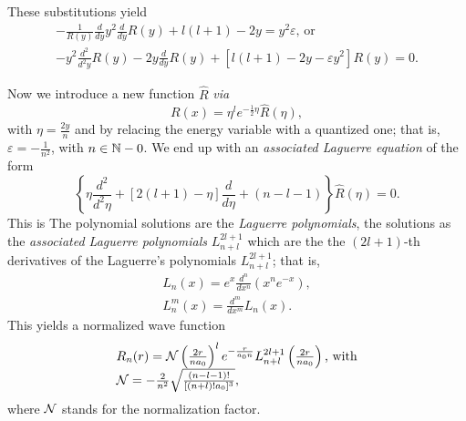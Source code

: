 These substitutions yield
\begin{equation}
\begin{array}{l}
-\frac{1}{R(y)} \frac{d}{   d    y}  y^2\frac{   d   }{   d    y} R( y ) +    l(l+1)
-2 y
 = y^2 \varepsilon \textrm{, or}\\
-y^2 \frac{d^2}{   d^2    y} R( y )  - 2 y \frac{   d   }{   d    y} R( y )
+ \left[   l(l+1) -2 y   -\varepsilon   y^2  \right] R( y )
 = 0.
\end{array}
\label{2011-m-ch-qae4a191}
\end{equation}

Now we introduce a new function $\hat{R}$  {\it via}
\begin{equation}
R(x)=\eta^l e^{-\frac{1}{2}\eta}\hat{R}(\eta) ,
\label{2011-m-ch-qae4a19s}
\end{equation}
with $\eta=\frac{2y}{n}$ and by relacing the energy variable with a quantized one;
that is,  $\varepsilon =-\frac{1}{n^2}$, with $n\in {\Bbb N}-0$.
We end up with an {\em associated Laguerre equation}
 of the form
\begin{equation}
\left\{
\eta   \frac{d^2}{   d^2    \eta }
+[2(l+1)-\eta ]  \frac{d }{   d     \eta }
+(n-l-1)
\right\}    \hat{R}( \eta ) =0.
\label{2011-m-ch-qaeale}
\end{equation}
This is
The polynomial solutions are the
{\em Laguerre polynomials},
 the solutions as the {\it associated Laguerre polynomials}
$L^{2l+1}_{n+l}$
which are the  the $(2l+1)$-th derivatives of the
Laguerre's polynomials  $L^{2l+1}_{n+l}$;
that is,
\begin{equation}
\begin{array}{l}
 L_n(x)=e^x   \frac{d^n }{   d     x^n }  \left (x^ne^{-x}\right),\\
 L_n^m(x)=   \frac{d^m }{   d     x^m }  L_n(x).
\end{array}
\label{2011-m-ch-qaelp}
\end{equation}
This yields a normalized wave function
\begin{equation}
\begin{array}{l}
R_n(r) =  {\cal N}
\left( \frac{2 {r}}{n a_0 }\right)^l e^{-\frac{r}{a_0 n}}
L^{2l+1}_{n+l} \left( \frac{2 {r}}{n a_0 }\right)\textrm{, with}\\
{\cal N}   =-\frac{2}{n^2}\sqrt{\frac{(n-l-1)!}{[(n+l)!a_0]^3}} ,
\end{array}
\label{2011-m-ch-qaecsrp}
\end{equation}
where
${\cal N}$ stands for the normalization factor.

